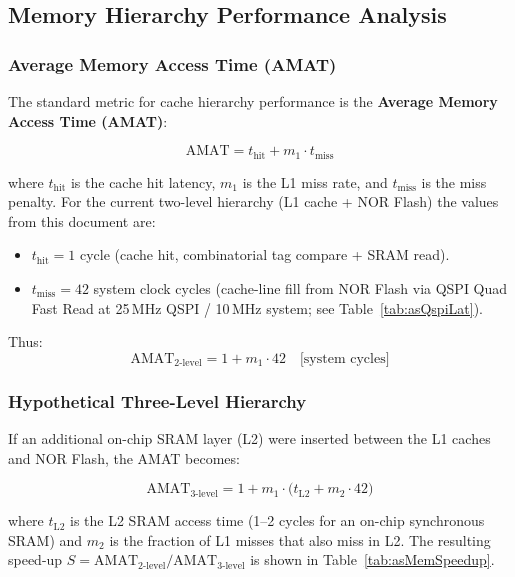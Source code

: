 \subsection{Memory Hierarchy Performance Analysis}
\label{subsec:memPerfAnalysis}

\subsubsection{Average Memory Access Time (AMAT)}

The standard metric for cache hierarchy performance is the
\textbf{Average Memory Access Time (AMAT)}:

\[
  \text{AMAT} = t_\text{hit} + m_1 \cdot t_\text{miss}
\]

where $t_\text{hit}$ is the cache hit latency, $m_1$ is the L1 miss rate,
and $t_\text{miss}$ is the miss penalty.
For the current two-level hierarchy (L1 cache + NOR Flash) the values
from this document are:

\begin{itemize}
  \item $t_\text{hit} = 1$ cycle (cache hit, combinatorial tag compare +
        SRAM read).
  \item $t_\text{miss} = 42$ system clock cycles (cache-line fill from
        NOR Flash via QSPI Quad Fast Read at 25\,MHz QSPI /
        10\,MHz system; see Table~\ref{tab:asQspiLat}).
\end{itemize}

Thus:
\[
  \text{AMAT}_\text{2-level} = 1 + m_1 \cdot 42 \quad \text{[system cycles]}
\]

\subsubsection{Hypothetical Three-Level Hierarchy}

If an additional on-chip SRAM layer (L2) were inserted between the L1
caches and NOR Flash, the AMAT becomes:

\[
  \text{AMAT}_\text{3-level} = 1 + m_1 \cdot \bigl(t_\text{L2} + m_2 \cdot 42\bigr)
\]

where $t_\text{L2}$ is the L2 SRAM access time (1--2 cycles for an
on-chip synchronous SRAM) and $m_2$ is the fraction of L1 misses that
also miss in L2.
The resulting speed-up $S = \text{AMAT}_\text{2-level} /
\text{AMAT}_\text{3-level}$ is shown in
Table~\ref{tab:asMemSpeedup}.

